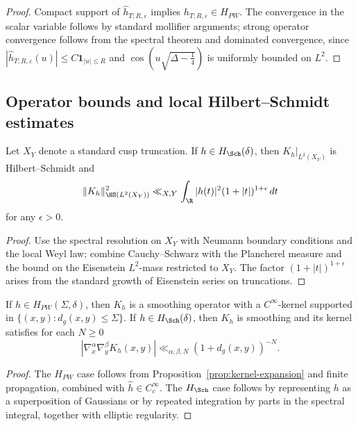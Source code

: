 \begin{proof}
Compact support of $\widehat h_{T;R,\varepsilon}$ implies $h_{T;R,\varepsilon}\in H_{PW}$. The convergence in the scalar variable follows by standard mollifier arguments; strong operator convergence follows from the spectral theorem and dominated convergence, since $|\widehat h_{T;R,\varepsilon}(u)|\le C\mathbf 1_{|u|\le R}$ and $\cos(u\sqrt{\Delta-\tfrac14})$ is uniformly bounded on $L^2$.
\end{proof}

\subsection{Operator bounds and local Hilbert–Schmidt estimates}
\label{subsec:operator-bounds}

\begin{lemma}
\label{lem:HS-trunc}
Let $X_Y$ denote a standard cusp truncation. If $h\in H_{\Sch}(\delta)$, then $K_h|_{L^2(X_Y)}$ is Hilbert–Schmidt and
\[
  \|K_h\|_{\HS(L^2(X_Y))}^2 \ll_{X,Y} \int_{\R} |h(t)|^2 (1+|t|)^{1+\epsilon}\,dt
\]
for any $\epsilon>0$.
\end{lemma}

\begin{proof}
Use the spectral resolution on $X_Y$ with Neumann boundary conditions and the local Weyl law; combine Cauchy–Schwarz with the Plancherel measure and the bound on the Eisenstein $L^2$-mass restricted to $X_Y$. The factor $(1+|t|)^{1+\epsilon}$ arises from the standard growth of Eisenstein series on truncations.
\end{proof}

\begin{proposition}
\label{prop:smoothing}
If $h\in H_{PW}(\Sigma,\delta)$, then $K_h$ is a smoothing operator with a $C^\infty$-kernel supported in $\{(x,y): d_g(x,y)\le \Sigma\}$. If $h\in H_{\Sch}(\delta)$, then $K_h$ is smoothing and its kernel satisfies for each $N\ge0$
\[
  |\nabla_x^\alpha \nabla_y^\beta K_h(x,y)| \ll_{\alpha,\beta,N} (1+d_g(x,y))^{-N}.
\]
\end{proposition}

\begin{proof}
The $H_{PW}$ case follows from Proposition~\ref{prop:kernel-expansion} and finite propagation, combined with $\widehat h\in C_c^\infty$. The $H_{\Sch}$ case follows by representing $h$ as a superposition of Gaussians or by repeated integration by parts in the spectral integral, together with elliptic regularity.
\end{proof}

